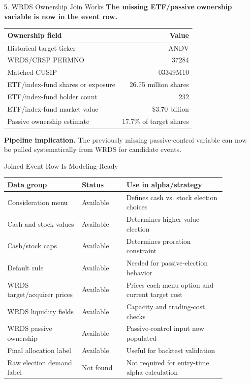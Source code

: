 \documentclass[aspectratio=169,11pt]{beamer}
\newcommand{\usd}[1]{\$#1}
\begin{document}
\begin{frame}{5. WRDS Ownership Join Works}
\small
\textbf{The missing ETF/passive ownership variable is now in the event row.}

\vspace{0.6em}
\begin{tabular}{lr}
\toprule
\textbf{Ownership field} & \textbf{Value} \\
\midrule
Historical target ticker & ANDV \\
WRDS/CRSP PERMNO & 37284 \\
Matched CUSIP & 03349M10 \\
ETF/index-fund shares or exposure & 26.75 million shares \\
ETF/index-fund holder count & 232 \\
ETF/index-fund market value & \usd{3.70} billion \\
Passive ownership estimate & 17.7\% of target shares \\
\bottomrule
\end{tabular}

\vspace{0.7em}
\textbf{Pipeline implication.} The previously missing passive-control variable can now be pulled systematically from WRDS for candidate events.
\end{frame}

\begin{frame}{Joined Event Row Is Modeling-Ready}
\small
\begin{tabular}{p{0.30\linewidth}p{0.18\linewidth}p{0.40\linewidth}}
\toprule
\textbf{Data group} & \textbf{Status} & \textbf{Use in alpha/strategy} \\
\midrule
Consideration menu & Available & Defines cash vs. stock election choices \\
Cash and stock values & Available & Determines higher-value election \\
Cash/stock caps & Available & Determines proration constraint \\
Default rule & Available & Needed for passive-election behavior \\
WRDS target/acquirer prices & Available & Prices each menu option and current target cost \\
WRDS liquidity fields & Available & Capacity and trading-cost checks \\
WRDS passive ownership & Available & Passive-control input now populated \\
Final allocation label & Available & Useful for backtest validation \\
Raw election demand label & Not found & Not required for entry-time alpha calculation \\
\bottomrule
\end{tabular}
\end{frame}
\end{document}
